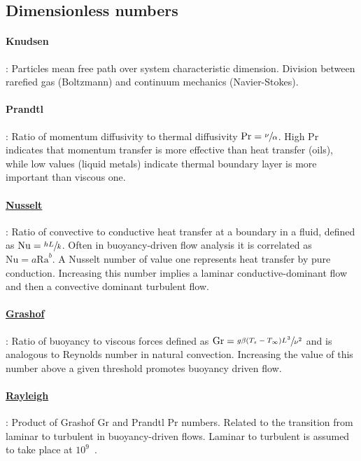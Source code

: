 \subsection{Dimensionless numbers}

\paragraph{Knudsen}: Particles mean free path over system characteristic dimension. Division between rarefied gas (Boltzmann) and continuum mechanics (Navier-Stokes).

\paragraph{Prandtl}: Ratio of momentum diffusivity to thermal diffusivity $\mathrm{Pr}=\sfrac{\nu}{\alpha}$. High $\mathrm{Pr}$ indicates that momentum transfer is more effective than heat transfer (oils), while low values (liquid metals) indicate thermal boundary layer is more important than viscous one.

\paragraph{\href{https://en.wikipedia.org/wiki/Nusselt_number}{Nusselt}}: Ratio of convective to conductive heat transfer at a boundary in a fluid, defined as $\mathrm{Nu}=\sfrac{hL}{k}$. Often in buoyancy-driven flow analysis it is correlated as $\mathrm{Nu}=a\mathrm{Ra}^b$. A Nusselt number of value one represents heat transfer by pure conduction. Increasing this number implies a laminar conductive-dominant flow and then a convective dominant turbulent flow.

\paragraph{\href{https://en.wikipedia.org/wiki/Grashof_number}{Grashof}}: Ratio of buoyancy to viscous forces defined as $\mathrm{Gr}=\sfrac{g\beta(T_s-T_{\infty})L^3}{\nu^2}$ and is analogous to Reynolds number in natural convection. Increasing the value of this number above a given threshold promotes buoyancy driven flow. 

\paragraph{\href{https://en.wikipedia.org/wiki/Rayleigh_number}{Rayleigh}}: Product of Grashof $\mathrm{Gr}$ and Prandtl $\mathrm{Pr}$ numbers. Related to the transition from laminar to turbulent in buoyancy-driven flows. Laminar to turbulent is assumed to take place at $10^9$~\cite{Balaji2014}.

\endinput